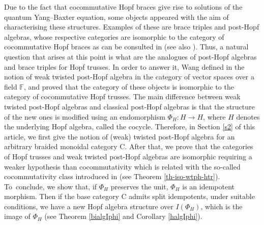 \documentclass[pdftex]{sigma}
\numberwithin{equation}{section}
\begin{document}
Due to the fact that cocommutative Hopf braces give rise to solutions of the quantum Yang--Baxter equation, some objects appeared with the aim of characterising these structures. Examples of these are brace triples and post-Hopf algebras, whose respective categories are isomorphic to the category of cocommutative Hopf braces as can be consulted in \cite[Theorems~2.18 and~3.16]{FGR} (see also \cite{LST}). Thus, a natural question that arises at this point is what are the analogues of post-Hopf algebras and brace triples for Hopf trusses. In order to answer it, Wang defined in \cite{Wang} the notion of weak twisted post-Hopf algebra in the category of vector spaces over a field $\mathbb{F}$, and proved that the category of these objects is isomorphic to the category of cocommutative Hopf trusses. The main difference between weak twisted post-Hopf algebras and classical post-Hopf algebras is that the structure of the new ones is modified using an endomorphism $\Phi_{H}\colon H\rightarrow H$, where $H$ denotes the underlying Hopf algebra, called the cocycle. Therefore, in Section \ref{s2} of this article, we first give the notion of (weak) twisted post-Hopf algebra for an arbitrary braided monoidal category {\sf C}. After that, we prove that the categories of Hopf trusses and weak twisted post-Hopf algebras are isomorphic requiring a weaker hypothesis than cocommutativity which is related with the so-called cocommutativity class introduced in \cite{CCH} (see Theorem \ref{th-iso-wtph-htr}). To~conclude, we show that, if $\Phi_{H}$ preserves the unit, $\Phi_{H}$ is an idempotent morphism. Then if the base category {\sf C} admits split idempotents, under suitable conditions, we have a new Hopf algebra structure over $I(\Phi_{H})$, which is the image of $\Phi_{H}$ (see Theorem \ref{bialgIphi} and Corollary \ref{halgIphi}).
\end{document}
